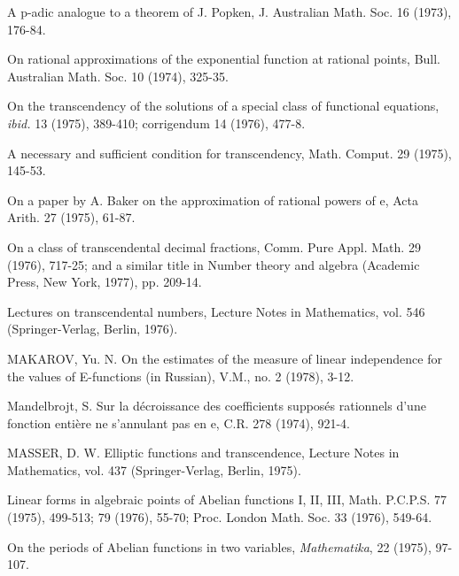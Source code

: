 \begin{hanglist}
    \item \hspace{1.5em} A p-adic analogue to a theorem of J. Popken, J. Australian Math. Soc. 16 (1973), 176-84.
    \item \hspace{1.5em} On rational approximations of the exponential function at rational points, Bull. Australian Math. Soc. 10 (1974), 325-35.
    \item \hspace{1.5em} On the transcendency of the solutions of a special class of functional equations, \textit{ibid.} 13 (1975), 389-410; corrigendum 14 (1976), 477-8.
    \item \hspace{1.5em} A necessary and sufficient condition for transcendency, Math. Comput. 29 (1975), 145-53.
    \item \hspace{1.5em} On a paper by A. Baker on the approximation of rational powers of e, Acta Arith. 27 (1975), 61-87.
    \item \hspace{1.5em} On a class of transcendental decimal fractions, Comm. Pure Appl. Math. 29 (1976), 717-25; and a similar title in Number theory and algebra (Academic Press, New York, 1977), pp. 209-14.
    \item \hspace{1.5em} Lectures on transcendental numbers, Lecture Notes in Mathematics, vol. 546 (Springer-Verlag, Berlin, 1976).
    \item MAKAROV, Yu. N. On the estimates of the measure of linear independence for the values of E-functions (in Russian), V.M., no. 2 (1978), 3-12.
    \item Mandelbrojt, S. Sur la décroissance des coefficients supposés rationnels d'une fonction entière ne s'annulant pas en e, C.R. 278 (1974), 921-4.
    \item MASSER, D. W. Elliptic functions and transcendence, Lecture Notes in Mathematics, vol. 437 (Springer-Verlag, Berlin, 1975).
    \item Linear forms in algebraic points of Abelian functions I, II, III, Math. P.C.P.S. 77 (1975), 499-513; 79 (1976), 55-70; Proc. London Math. Soc. 33 (1976), 549-64.
    \item On the periods of Abelian functions in two variables, \textit{Mathematika}, 22 (1975), 97-107.

\end{hanglist}
